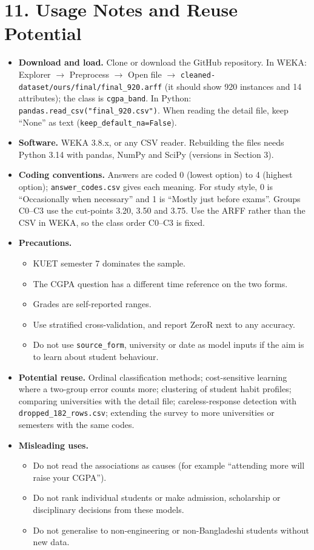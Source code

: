 \documentclass[11pt,a4paper]{article}
\begin{document}
\section{11. Usage Notes and Reuse Potential}
\begin{itemize}
\item \textbf{Download and load.} Clone or download the GitHub repository. In WEKA: Explorer $\rightarrow$ Preprocess $\rightarrow$ Open file $\rightarrow$ \texttt{cleaned-dataset/ours/final/final\_920.arff} (it should show 920 instances and 14 attributes); the class is \texttt{cgpa\_band}. In Python: \texttt{pandas.read\_csv("final\_920.csv")}. When reading the detail file, keep ``None'' as text (\texttt{keep\_default\_na=False}).
\item \textbf{Software.} WEKA 3.8.x, or any CSV reader. Rebuilding the files needs Python 3.14 with pandas, NumPy and SciPy (versions in Section 3).
\item \textbf{Coding conventions.} Answers are coded 0 (lowest option) to 4 (highest option); \texttt{answer\_codes.csv} gives each meaning. For study style, 0 is ``Occasionally when necessary'' and 1 is ``Mostly just before exams''. Groups C0--C3 use the cut-points 3.20, 3.50 and 3.75. Use the ARFF rather than the CSV in WEKA, so the class order C0--C3 is fixed.
\item \textbf{Precautions.}
  \begin{itemize}
  \item KUET semester 7 dominates the sample.
  \item The CGPA question has a different time reference on the two forms.
  \item Grades are self-reported ranges.
  \item Use stratified cross-validation, and report ZeroR next to any accuracy.
  \item Do not use \texttt{source\_form}, university or date as model inputs if the aim is to learn about student behaviour.
  \end{itemize}
\item \textbf{Potential reuse.} Ordinal classification methods; cost-sensitive learning where a two-group error counts more; clustering of student habit profiles; comparing universities with the detail file; careless-response detection with \texttt{dropped\_182\_rows.csv}; extending the survey to more universities or semesters with the same codes.
\item \textbf{Misleading uses.}
  \begin{itemize}
  \item Do not read the associations as causes (for example ``attending more will raise your CGPA'').
  \item Do not rank individual students or make admission, scholarship or disciplinary decisions from these models.
  \item Do not generalise to non-engineering or non-Bangladeshi students without new data.
  \end{itemize}
\end{itemize}
\end{document}
